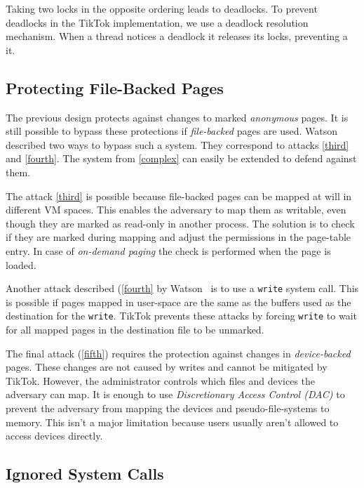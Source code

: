 \documentclass[conference]{IEEEtran}
\newcommand{\sysname}{TikTok}
\begin{document}
Taking two locks in the opposite ordering leads to deadlocks. To prevent
deadlocks in the \sysname{} implementation, we use a deadlock resolution
mechanism. When a thread notices a deadlock it releases its locks, preventing a
it.

\subsection{Protecting File-Backed Pages}
\label{subsec:fileprot}

The previous design protects against changes to marked \emph{anonymous} pages. It is
still possible to bypass these protections if \emph{file-backed} pages are used.
Watson~\cite{watson2007exploiting} described two ways to bypass such a system.
They correspond to attacks \autoref{third} and \autoref{fourth}. The system from
\autoref{complex} can easily be extended to defend against them.

The attack \autoref{third} is possible because file-backed pages can be mapped
at will in different VM spaces. This enables the adversary to map them as
writable, even though they are marked as read-only in another process. The 
solution is to check if they are marked during mapping and adjust the permissions
in the page-table entry. In case of \emph{on-demand paging} the check is performed
when the page is loaded.

Another attack described (\autoref{fourth} by Watson~\cite{watson2007exploiting}
is to use a \texttt{write} system call. This is possible if pages mapped in
user-space are the same as the buffers used as the destination for the
\texttt{write}. \sysname{} prevents these attacks by forcing \texttt{write} to
wait for all mapped pages in the destination file to be unmarked.

The final attack (\autoref{fifth}) requires the protection against changes in
\emph{device-backed} pages. These changes are not caused by writes and cannot be
mitigated by \sysname{}. However, the administrator controls which files and
devices the adversary can map. It is enough to use \emph{Discretionary Access
Control (DAC)} to prevent the adversary from mapping the devices and
pseudo-file-systems to memory. This isn't a major limitation because users
usually aren't allowed to access devices directly.

\subsection{Ignored System Calls}
\label{subsec:ignoredcalls}
\end{document}
